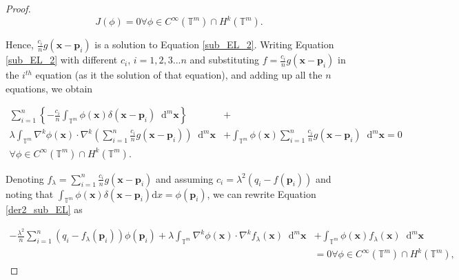 \documentclass[multixcb]{amstext-l}
\theoremstyle{plain}
\theoremstyle{definition}
\theoremstyle{definition}
\theoremstyle{remark}
\numberwithin{equation}{chapter}
\begin{document}
\begin{proof}
\begin{equation}
    J(\phi) = 0 \forall \phi\in C^{\infty}(\mathbb{T}^m)\cap H^k(\mathbb{T}^m).
\end{equation}

Hence, $\frac{c_i}{n}g(\boldsymbol{x}-\boldsymbol{p}_i)$ is a solution to Equation \ref{sub_EL_2}.  Writing Equation \ref{sub_EL_2} with different $c_i$, $i = 1,2,3...n$ and substituting $f=\frac{c_i}{n}g(\boldsymbol{x}-\boldsymbol{p}_i)$ in the $i^{th}$ equation (as it the solution of that equation), and adding up all the $n$ equations, we obtain 

\begin{equation}
    \label{der2_sub_EL}
    \begin{aligned}
     \sum\limits_{i=1}^n\left\{-\frac{c_i}{n}\int_{\mathbb{T}^m} \phi(\boldsymbol{x})\delta(\boldsymbol{x}-\boldsymbol{p}_i)\mathop{}\!\mathrm{d}^m\boldsymbol{x}\right\} &+\\ \lambda\int_{\mathbb{T}^m} \nabla^k\phi(\boldsymbol{x})\cdot\nabla^k\left( \sum\limits_{i=1}^n \frac{c_i}{n}g(\boldsymbol{x}-\boldsymbol{p}_i)\right)\mathop{}\!\mathrm{d}^m\boldsymbol{x} &+ \int_{\mathbb{T}^m} \phi(\boldsymbol{x})\sum\limits_{i=1}^n \frac{c_i}{n}g(\boldsymbol{x}-\boldsymbol{p}_i)\mathop{}\!\mathrm{d}^m\boldsymbol{x} = 0\\ \forall \phi\in C^{\infty}(\mathbb{T}^m)\cap H^k(\mathbb{T}^m).
     \end{aligned}
\end{equation}

Denoting $f_{\lambda} = \sum\limits_{i=1}^n \frac{c_i}{n}g(\boldsymbol{x}-\boldsymbol{p}_i)$ and assuming $c_i = \lambda^2(q_i-f(\boldsymbol{p}_i))$ and noting that $\int_{\mathbb{T}^m}\phi(\boldsymbol{x})\delta(\boldsymbol{x}-\boldsymbol{p}_i)\mathrm{d}x = \phi(\boldsymbol{p}_i)$, we can rewrite Equation \ref{der2_sub_EL} as 

\begin{equation}
    \label{der3_sub_EL}
    \begin{aligned}
      -\frac{\lambda^2}{n}\sum\limits_{i=1}^n (q_i-f_{\lambda}(\boldsymbol{p}_i))\phi(\boldsymbol{p}_i) + \lambda\int_{\mathbb{T}^m} \nabla^k\phi(\boldsymbol{x})\cdot\nabla^k f_{\lambda}(\boldsymbol{x})\mathop{}\!\mathrm{d}^m\boldsymbol{x} &+ \int_{\mathbb{T}^m} \phi(\boldsymbol{x})f_{\lambda}(\boldsymbol{x})\mathop{}\!\mathrm{d}^m\boldsymbol{x}\\
     &= 0 \forall \phi\in C^{\infty}(\mathbb{T}^m)\cap H^k(\mathbb{T}^m),
     \end{aligned}
\end{equation}


\end{proof}
\end{document}
